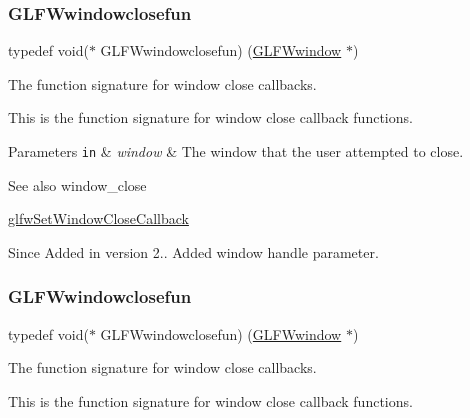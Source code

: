 \subsubsection{\texorpdfstring{G\+L\+F\+Wwindowclosefun}{GLFWwindowclosefun}\hspace{0.1cm}{\footnotesize\ttfamily [4/5]}}
{\footnotesize\ttfamily typedef void($\ast$  G\+L\+F\+Wwindowclosefun) (\hyperlink{group__window_ga3c96d80d363e67d13a41b5d1821f3242}{G\+L\+F\+Wwindow} $\ast$)}



The function signature for window close callbacks. 

This is the function signature for window close callback functions.


\begin{DoxyParams}[1]{Parameters}
\mbox{\tt in}  & {\em window} & The window that the user attempted to close.\\
\hline
\end{DoxyParams}
\begin{DoxySeeAlso}{See also}
window\+\_\+close 

\hyperlink{group__window_ga5b827da350141c789acd64f5c4f7a0e1}{glfw\+Set\+Window\+Close\+Callback}
\end{DoxySeeAlso}
\begin{DoxySince}{Since}
Added in version 2..  Added window handle parameter. 
\end{DoxySince}
\mbox{\label{group__window_ga93e7c2555bd837f4ed8b20f76cada72e}} 
\subsubsection{\texorpdfstring{G\+L\+F\+Wwindowclosefun}{GLFWwindowclosefun}\hspace{0.1cm}{\footnotesize\ttfamily [5/5]}}
{\footnotesize\ttfamily typedef void($\ast$  G\+L\+F\+Wwindowclosefun) (\hyperlink{group__window_ga3c96d80d363e67d13a41b5d1821f3242}{G\+L\+F\+Wwindow} $\ast$)}



The function signature for window close callbacks. 

This is the function signature for window close callback functions.


